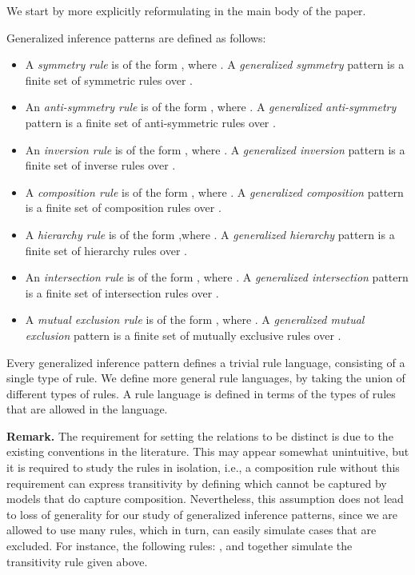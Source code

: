 \documentclass{article}
\begin{document}
We start by more explicitly reformulating  in the main body of the paper.
\begin{definition} Generalized inference patterns are defined as follows:
\begin{itemize}
\item A \emph{symmetry rule} is of the form , where . A \emph{generalized symmetry} pattern is a finite set of symmetric rules over .

\item An \emph{anti-symmetry rule} is of the form , where . A \emph{generalized anti-symmetry} pattern is a finite set of anti-symmetric rules over .

\item An \emph{inversion rule} is of the form , where . A \emph{generalized inversion} pattern is a finite set of inverse rules over .

\item A \emph{composition rule} is of the form , where .  A \emph{generalized composition} pattern is a finite set of composition rules over  .

\item A \emph{hierarchy rule} is of the form ,where . A \emph{generalized hierarchy} pattern is a finite set of hierarchy rules over .

\item An \emph{intersection rule} is of the form ,  where .  A \emph{generalized intersection} pattern is a finite set of intersection rules over .

\item A \emph{mutual exclusion rule} is of the form ,  where .  A \emph{generalized mutual exclusion} pattern is a finite set of mutually exclusive rules over .
\end{itemize} 
Every generalized inference pattern defines a trivial rule language, consisting of a single type of rule.
We define more general rule languages, by taking the union of different types of rules.
A rule language  is defined in terms of the types of rules that are allowed in the language.
\end{definition}

\textbf{Remark.} The requirement for setting the relations to be distinct is due to the existing conventions in the literature. This may appear somewhat unintuitive, but it is required to study the rules in isolation, i.e., a composition rule without this requirement can express transitivity by defining  which cannot be captured by models that do capture composition.
Nevertheless, this assumption does not lead to loss of generality for our study of generalized inference patterns, since we are allowed to use many rules, which in turn, can easily simulate cases that are excluded. For instance, the following rules:
, and  together simulate the transitivity rule given above. 
\end{document}
